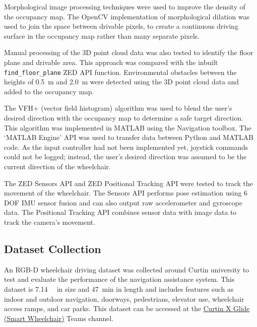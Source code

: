 Morphological image processing techniques were used to improve the density of the occupancy map.
The OpenCV \cite{bradskiOpenCVLibrary2000} implementation of morphological dilation was used to
join the space between drivable pixels, to create a continuous driving surface in the occupancy map
rather than many separate pixels.

Manual processing of the 3D point cloud data was also tested to identify the floor plane and drivable area.
This approach was compared with the inbuilt \texttt{find\_floor\_plane} ZED API function.
Environmental obstacles between the heights of \SI{0.5}{\metre} and \SI{2.0}{\metre} were
detected using the 3D point cloud data and added to the occupancy map.

The VFH+ (vector field histogram) algorithm \cite{ulrichVFHReliableObstacle1998} was used to blend
the user's desired direction with the occupancy map to determine a safe target direction.
This algorithm was implemented in MATLAB using the Navigation toolbox. The `MATLAB Engine' API
was used to transfer data between Python and MATLAB code.
As the input controller had not been implemented yet, joystick commands could not be logged; instead,
the user's desired direction was assumed to be the current direction of the wheelchair.

The ZED Sensors API and ZED Positional Tracking API were tested to track the movement of the wheelchair.
The Sensors API performs pose estimation using 6 DOF IMU sensor fusion and can also output raw accelerometer
and gyroscope data. The Positional Tracking API combines sensor data with image data to track the camera's movement.

\subsection{Dataset Collection}
An RGB-D wheelchair driving dataset was collected around Curtin university
to test and evaluate the performance of the navigation assistance system.
This dataset is \SI{7.14}{\giga\byte} in size and \SI{47}{\minute} in length
and includes features such as indoor and outdoor navigation, doorways, pedestrians,
elevator use, wheelchair access ramps, and car parks. This dataset can be accessed at the
\href{https://curtin.sharepoint.com/:f:/r/sites/CurtinXGlide/Shared%20Documents/Navigation%20and%20Object%20Detection/ZED?csf=1&web=1&e=tTau9D}{\underline{Curtin X Glide (Smart Wheelchair)}} Teams channel.

